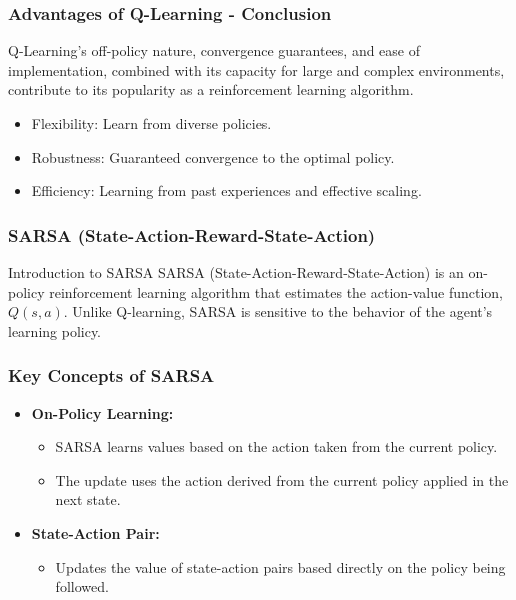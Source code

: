 \documentclass[aspectratio=169]{beamer}
\begin{document}
\begin{frame}[fragile]
    \frametitle{Advantages of Q-Learning - Conclusion}
    Q-Learning's off-policy nature, convergence guarantees, and ease of implementation, combined with its capacity for large and complex environments, contribute to its popularity as a reinforcement learning algorithm.
    \begin{itemize}
        \item Flexibility: Learn from diverse policies.
        \item Robustness: Guaranteed convergence to the optimal policy.
        \item Efficiency: Learning from past experiences and effective scaling.
    \end{itemize}
\end{frame}

\begin{frame}[fragile]
    \frametitle{SARSA (State-Action-Reward-State-Action)}
    \begin{block}{Introduction to SARSA}
        SARSA (State-Action-Reward-State-Action) is an on-policy reinforcement learning algorithm that estimates the action-value function, \( Q(s, a) \).
        Unlike Q-learning, SARSA is sensitive to the behavior of the agent's learning policy.
    \end{block}
\end{frame}

\begin{frame}[fragile]
    \frametitle{Key Concepts of SARSA}
    \begin{itemize}
        \item \textbf{On-Policy Learning:} 
        \begin{itemize}
            \item SARSA learns values based on the action taken from the current policy.
            \item The update uses the action derived from the current policy applied in the next state.
        \end{itemize}
        \item \textbf{State-Action Pair:}
        \begin{itemize}
            \item Updates the value of state-action pairs based directly on the policy being followed.
        \end{itemize}
    \end{itemize}
\end{frame}
\end{document}
